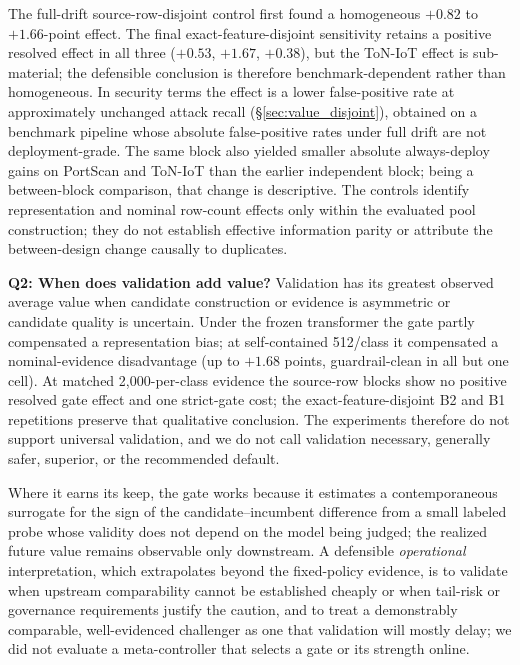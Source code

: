 \documentclass[journal]{IEEEtran}
\begin{document}
The full-drift source-row-disjoint control first found a homogeneous $+0.82$ to $+1.66$-point effect. The final exact-feature-disjoint sensitivity retains a positive resolved effect in all three ($+0.53$, $+1.67$, $+0.38$), but the ToN-IoT effect is sub-material; the defensible conclusion is therefore benchmark-dependent rather than homogeneous. In security terms the effect is a lower false-positive rate at approximately unchanged attack recall (\S\ref{sec:value_disjoint}), obtained on a benchmark pipeline whose absolute false-positive rates under full drift are not deployment-grade. The same block also yielded smaller absolute always-deploy gains on PortScan and ToN-IoT than the earlier independent block; being a between-block comparison, that change is descriptive. The controls identify representation and nominal row-count effects only within the evaluated pool construction; they do not establish effective information parity or attribute the between-design change causally to duplicates.

\textbf{Q2: When does validation add value?} Validation has its greatest observed average value when candidate construction or evidence is asymmetric or candidate quality is uncertain. Under the frozen transformer the gate partly compensated a representation bias; at self-contained 512/class it compensated a nominal-evidence disadvantage (up to $+1.68$ points, guardrail-clean in all but one cell). At matched 2{,}000-per-class evidence the source-row blocks show no positive resolved gate effect and one strict-gate cost; the exact-feature-disjoint B2 and B1 repetitions preserve that qualitative conclusion. The experiments therefore do not support universal validation, and we do not call validation necessary, generally safer, superior, or the recommended default.

Where it earns its keep, the gate works because it estimates a contemporaneous surrogate for the sign of the candidate--incumbent difference from a small labeled probe whose validity does not depend on the model being judged; the realized future value remains observable only downstream. A defensible \emph{operational} interpretation, which extrapolates beyond the fixed-policy evidence, is to validate when upstream comparability cannot be established cheaply or when tail-risk or governance requirements justify the caution, and to treat a demonstrably comparable, well-evidenced challenger as one that validation will mostly delay; we did not evaluate a meta-controller that selects a gate or its strength online.
\end{document}
